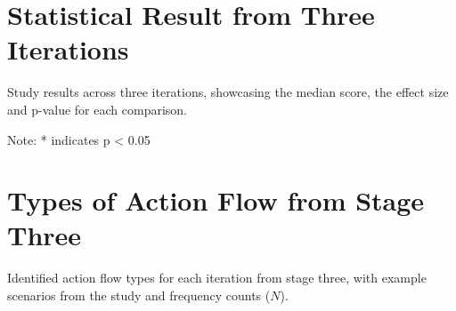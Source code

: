 \onecolumn



\section{Statistical Result from Three Iterations}

\begin{table}[htbp]
\centering

\caption{Study results across three iterations, showcasing the median score, the effect size and p-value for each comparison.}
\label{tab:study_results}
\footnotesize{Note: * indicates p < 0.05}
\end{table}



\section{Types of Action Flow from Stage Three}
\begin{table*}[]
    \centering
    
    \caption{Identified action flow types for each iteration from stage three, with example scenarios from the study and frequency counts ($N$).}
    \label{tab:flow}
\end{table*}